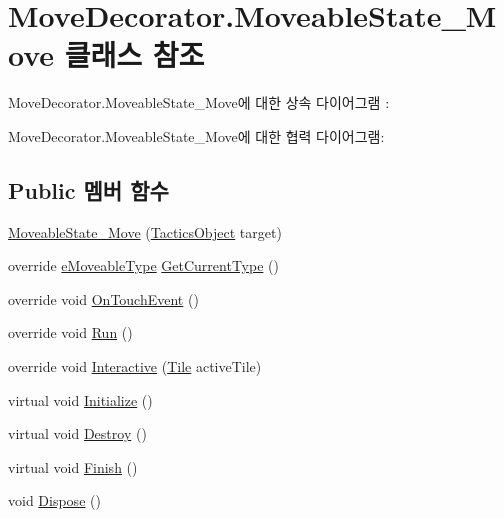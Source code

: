 \hypertarget{class_move_decorator_1_1_moveable_state___move}{}\section{Move\+Decorator.\+Moveable\+State\+\_\+\+Move 클래스 참조}
\label{class_move_decorator_1_1_moveable_state___move}


Move\+Decorator.\+Moveable\+State\+\_\+\+Move에 대한 상속 다이어그램 \+: 


Move\+Decorator.\+Moveable\+State\+\_\+\+Move에 대한 협력 다이어그램\+:
\subsection*{Public 멤버 함수}
\begin{DoxyCompactItemize}
\item 
\hyperlink{class_move_decorator_1_1_moveable_state___move_a99f0c50b04a1bf2329d3cfed347f0e5a}{Moveable\+State\+\_\+\+Move} (\hyperlink{class_tactics_object}{Tactics\+Object} target)
\item 
override \hyperlink{_move_decorator_8cs_a90215797ba850e199f3ef63d7c56f132}{e\+Moveable\+Type} \hyperlink{class_move_decorator_1_1_moveable_state___move_a92389a089bde6eb88cf9b1467f7f4df5}{Get\+Current\+Type} ()
\item 
override void \hyperlink{class_move_decorator_1_1_moveable_state___move_a8ca9e04efc9369fd9ca9f200bb0dd0a6}{On\+Touch\+Event} ()
\item 
override void \hyperlink{class_move_decorator_1_1_moveable_state___move_ae1bb2c9ca5992373aa872788775d3e4a}{Run} ()
\item 
override void \hyperlink{class_move_decorator_1_1_moveable_state___move_a9e9c360898b9c25fcc478ef2db20f316}{Interactive} (\hyperlink{class_tile}{Tile} active\+Tile)
\item 
virtual void \hyperlink{class_m_c_n_1_1_state_a5be59bc891e64cbbe4322d74a6746908}{Initialize} ()
\item 
virtual void \hyperlink{class_m_c_n_1_1_state_aebf48ef248bbf185d6aae91d9789459e}{Destroy} ()
\item 
virtual void \hyperlink{class_m_c_n_1_1_state_a2492ca731678b8216c02134dddeeb745}{Finish} ()
\item 
void \hyperlink{class_m_c_n_1_1_state_af6df0477e0dead784489688cb2c2093e}{Dispose} ()
\end{DoxyCompactItemize}
